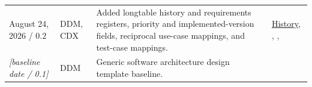 \begin{tabularx}{\linewidth}{L{3.1cm}L{2.2cm}YL{2.0cm}}
August 24, 2026 / 0.2 & DDM, CDX & Added longtable history and requirements registers, priority and implemented-version fields, reciprocal use-case mappings, and test-case mappings. & \hyperref[Table:DocumentHistory]{History}, , , \\
\textit{[baseline date / 0.1]} & DDM & Generic software architecture design template baseline. & \\
\end{tabularx}
